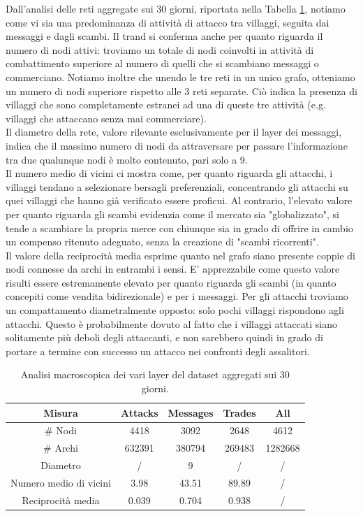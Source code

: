 Dall'analisi delle reti aggregate sui 30 giorni, riportata nella Tabella \ref{tab:summary}, notiamo come vi sia una predominanza di attività di attacco tra villaggi, seguita dai messaggi e dagli scambi. Il trand si conferma anche per quanto riguarda il numero di nodi attivi: troviamo un totale di nodi coinvolti in attività di combattimento superiore al numero di quelli che si scambiano messaggi o commerciano. Notiamo inoltre che unendo le tre reti in un unico grafo, otteniamo un numero di nodi superiore rispetto alle 3 reti separate. Ciò indica la presenza di villaggi che sono completamente estranei ad una di queste tre attività (e.g. villaggi che attaccano senza mai commerciare).\\
Il diametro della rete, valore rilevante esclusivamente per il layer dei messaggi, indica che il massimo numero di nodi da attraversare per passare l'informazione tra due qualunque nodi è molto contenuto, pari solo a 9.\\
Il numero medio di vicini ci mostra come, per quanto riguarda gli attacchi, i villaggi tendano a selezionare bersagli preferenziali, concentrando gli attacchi su quei villaggi che hanno già verificato essere proficui. Al contrario, l'elevato valore per quanto riguarda gli scambi evidenzia come il mercato sia "globalizzato", si tende a scambiare la propria merce con chiunque sia in grado di offrire in cambio un compenso ritenuto adeguato, senza la creazione di "scambi ricorrenti".\\
Il valore della reciprocità media esprime quanto nel grafo siano presente coppie di nodi connesse da archi in entrambi i sensi. E' apprezzabile come questo valore risulti essere estremamente elevato per quanto riguarda gli scambi (in quanto concepiti come vendita bidirezionale) e per i messaggi. Per gli attacchi troviamo un compattamento diametralmente opposto: solo pochi villaggi rispondono agli attacchi. Questo è probabilmente dovuto al fatto che i villaggi attaccati siano solitamente più deboli degli attaccanti, e non sarebbero quindi in grado di portare a termine con successo un attacco nei confronti degli assalitori.
\begin{table}[h]
	\centering
	\caption{Analisi macroscopica dei vari layer del dataset aggregati sui 30 giorni.}
	\begin{tabular}{|c|c|c|c|c|}
		\hline 
		Misura & Attacks & Messages & Trades & All \\ 
		\hline 
		\# Nodi & 4418 & 3092 & 2648 & 4612 \\ 
		\hline 
		\# Archi & 632391 & 380794 & 269483 & 1282668 \\ 
		\hline 
		Diametro & / & 9 & / & / \\ 
		\hline 
		Numero medio di vicini & 3.98 & 43.51 & 89.89 & / \\ 
		\hline 
		Reciprocità media & 0.039 & 0.704 & 0.938 & / \\ 
		\hline 
	\end{tabular} 
	\label{tab:summary}
\end{table}

